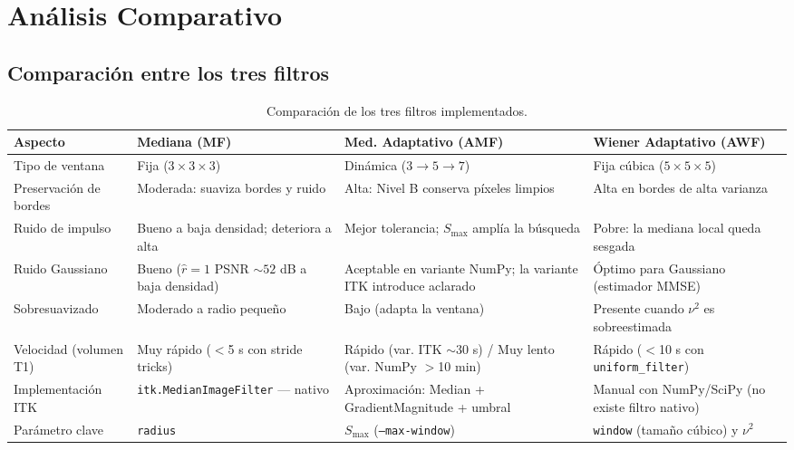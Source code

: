 \documentclass[12pt, a4paper]{article}
\begin{document}
\section{Análisis Comparativo}

\subsection{Comparación entre los tres filtros}

\begin{table}[H]
\centering
\renewcommand{\arraystretch}{1.5}
\begin{tabularx}{\textwidth}{lXXX}
\toprule
\textbf{Aspecto} &
\textbf{Mediana (MF)} &
\textbf{Med. Adaptativo (AMF)} &
\textbf{Wiener Adaptativo (AWF)} \\
\midrule
Tipo de ventana &
Fija ($3\times3\times3$) &
Dinámica ($3\to5\to7$) &
Fija cúbica ($5\times5\times5$) \\

Preservación de bordes &
Moderada: suaviza bordes y ruido &
Alta: Nivel B conserva píxeles limpios &
Alta en bordes de alta varianza \\

Ruido de impulso &
Bueno a baja densidad; deteriora a alta &
Mejor tolerancia; $S_{\max}$ amplía la búsqueda &
Pobre: la mediana local queda sesgada \\

Ruido Gaussiano &
Bueno ($\hat{r}=1$ PSNR $\sim52$ dB a baja densidad) &
Aceptable en variante NumPy; la variante ITK introduce aclarado &
Óptimo para Gaussiano (estimador MMSE) \\

Sobresuavizado &
Moderado a radio pequeño &
Bajo (adapta la ventana) &
Presente cuando $\nu^2$ es sobreestimada \\

Velocidad (volumen T1) &
Muy rápido ($<$5 s con stride tricks) &
Rápido (var. ITK $\sim$30 s) / Muy lento (var. NumPy $>$10 min) &
Rápido ($<$10 s con \texttt{uniform\_filter}) \\

Implementación ITK &
\texttt{itk.MedianImageFilter} — nativo &
Aproximación: Median + GradientMagnitude + umbral &
Manual con NumPy/SciPy (no existe filtro nativo) \\

Parámetro clave &
\texttt{radius} &
$S_{\max}$ (\texttt{--max-window}) &
\texttt{window} (tamaño cúbico) y $\nu^2$ \\
\bottomrule
\end{tabularx}
\caption{Comparación de los tres filtros implementados.}
\label{tab:comparison}
\end{table}
\end{document}
